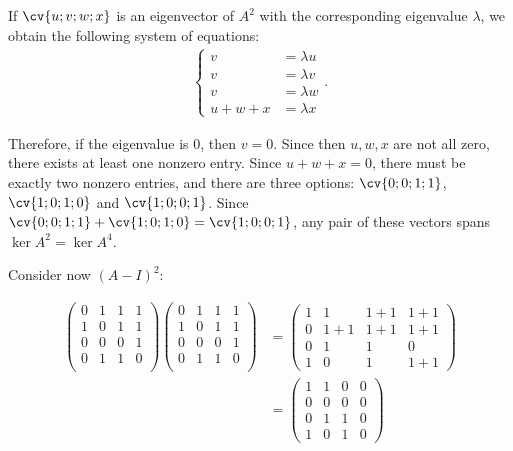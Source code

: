 \documentclass[11pt]{scrartcl}
\begin{document}
\begin{soln}
  If $\cv{u;v;w;x}$ is an eigenvector of $A^2$ with the corresponding eigenvalue $\lambda$, we obtain the following system of equations:
  \begin{align}
    \begin{cases}
      v     & = \lambda u \\
      v     & = \lambda v \\
      v     & = \lambda w \\
      u+w+x & = \lambda x
    \end{cases}.
  \end{align}

  Therefore, if the eigenvalue is $0$, then $v=0$. Since then
  $u, w, x$ are not all zero, there exists at least one nonzero
  entry. Since $u+w+x=0$, there must be exactly two nonzero entries,
  and there are three options: $\cv{0;0;1;1}$, $\cv{1;0;1;0}$ and
  $\cv{1;0;0;1}$. Since $\cv{0;0;1;1}+\cv{1;0;1;0} = \cv{1;0;0;1}$, any pair of these vectors spans $\ker A^2=\ker A^4$.

  Consider now $(A-I)^2$:

  \begin{align}
    \begin{pmatrix}
      0                 & 1   & 1   & 1   \\
      1                 & 0   & 1   & 1   \\
      0                 & 0   & 0   & 1   \\
      0                 & 1   & 1   & 0   \\
    \end{pmatrix}
    \begin{pmatrix}
      0                 & 1   & 1   & 1   \\
      1                 & 0   & 1   & 1   \\
      0                 & 0   & 0   & 1   \\
      0                 & 1   & 1   & 0   \\
    \end{pmatrix}       & = 
                    \begin{pmatrix}
                      1 & 1   & 1+1 & 1+1 \\
                      0 & 1+1 & 1+1 & 1+1 \\
                      0 & 1   & 1   & 0   \\
                      1 & 0   & 1   & 1+1
                    \end{pmatrix}\\
                        & =
                          \begin{pmatrix}
                            1 & 1   & 0 & 0 \\
                            0 & 0 & 0 & 0 \\
                            0 & 1   & 1   & 0   \\
                            1 & 0   & 1   & 0
                          \end{pmatrix}
  \end{align}


\end{soln}
\end{document}
